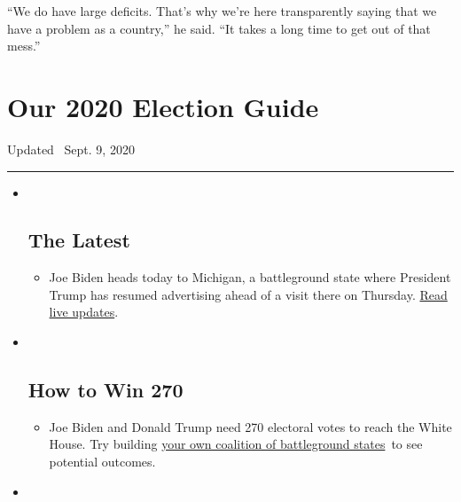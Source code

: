 ``We do have large deficits. That's why we're here transparently saying
that we have a problem as a country,'' he said. ``It takes a long time
to get out of that mess.''

\hypertarget{our-2020-election-guide}{%
\section{Our 2020 Election Guide}\label{our-2020-election-guide}}

Updated ~Sept. 9, 2020

\begin{center}\rule{0.5\linewidth}{\linethickness}\end{center}

\begin{itemize}
\item ~
  \hypertarget{the-latest}{%
  \subsection{The Latest}\label{the-latest}}

  \begin{itemize}
  \item
    Joe Biden heads today to Michigan, a battleground state where
    President Trump has resumed advertising ahead of a visit there on
    Thursday.
    \href{https://www.nytimes3xbfgragh.onion/live/2020/09/09/us/trump-vs-biden?action=click\&pgtype=Article\&state=default\&region=BELOW_MAIN_CONTENT\&context=storylines_guide}{Read
    live updates}.
  \end{itemize}
\item ~
  \hypertarget{how-to-win-270}{%
  \subsection{How to Win 270}\label{how-to-win-270}}

  \begin{itemize}
  \item
    Joe Biden and Donald Trump need 270 electoral votes to reach the
    White House. Try building
    \href{https://www.nytimes3xbfgragh.onion/interactive/2020/us/elections/election-states-biden-trump.html?action=click\&pgtype=Article\&state=default\&region=BELOW_MAIN_CONTENT\&context=storylines_guide}{your
    own coalition of battleground states}~to see potential outcomes.
  \end{itemize}
\item ~
  \hypertarget{voting-by-mail}{%
}
\end{itemize}
